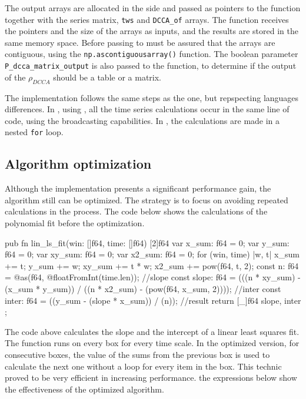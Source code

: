 \documentclass[nojss]{jss}
\begin{document}
The output arrays are allocated in the  side and passed as pointers to the  function together with the series matrix, \verb"tws" and \verb"DCCA_of" arrays. The  function receives the pointers and the size of the arrays as inputs, and the results are stored in the same memory space. Before passing to  must be assured that the arrays are contiguous, using the \verb"np.ascontiguousarray()" function. The boolean parameter \verb"P_dcca_matrix_output" is also passed to the  function, to determine if the output of the $\rho_{DCCA}$ should be a table or a matrix.

The  implementation follows the same steps as the  one, but repspecting languages differences. In , using , all the time series calculations occur in the same line of code, using the  broadcasting capabilities. In , the calculations are made in a nested \verb"for" loop.

\subsection{Algorithm optimization}

Although the  implementation presents a significant performance gain, the algorithm still can be optimized. The strategy is to focus on avoiding repeated calculations in the process. The code below shows the calculations of the polynomial fit before the optimization.

\begin{Code}
  pub fn lin_ls_fit(win: []f64, time: []f64) [2]f64 {
    var x_sum: f64 = 0;
    var y_sum: f64 = 0;
    var xy_sum: f64 = 0;
    var x2_sum: f64 = 0;
    for (win, time) |w, t| {
        x_sum += t;
        y_sum += w;
        xy_sum += t * w;
        x2_sum += pow(f64, t, 2);
    }
    const n: f64 = @as(f64, @floatFromInt(time.len));
    //slope
    const slope: f64 = (((n * xy_sum) - (x_sum * y_sum)) /
        ((n * x2_sum) - (pow(f64, x_sum, 2))));
    //inter
    const inter: f64 = ((y_sum - (slope * x_sum)) /
        (n));
    //result
    return [_]f64{ slope, inter };
}
\end{Code}

The code above calculates the slope and the intercept of a linear least squares fit. The function runs on every box for every time scale. In the optimized version, for consecutive boxes, the value of the sums from the previous box is used to calculate the next one without a loop for every item in the box. This technic proved to be very efficient in increasing performance. the expressions below show the effectiveness of the optimized algorithm.
\end{document}
